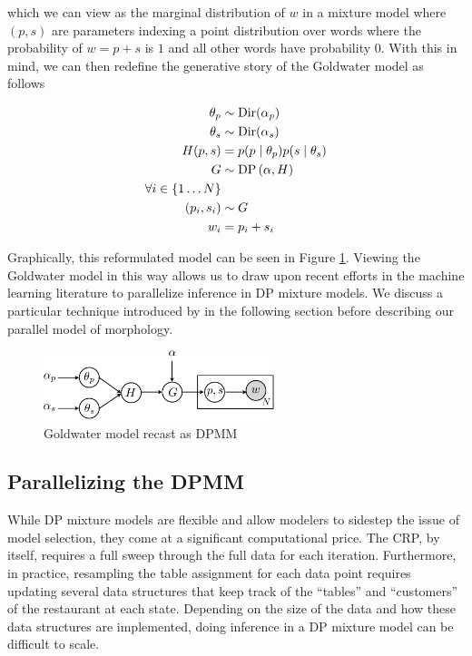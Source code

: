 which we can view as the marginal distribution of $w$ in a mixture
model where $(p,s)$ are parameters indexing a point distribution over
words where the probability of $w = p + s$ is $1$ and all other words
have probability $0$. With this in mind, we can then redefine the
generative story of the Goldwater model as follows

\begin{align*}
  \theta_p & \sim \mathrm{Dir}(\alpha_p) \\
  \theta_s & \sim \mathrm{Dir}(\alpha_s) \\
  H(p, s) & = p(p \mid \theta_p) p(s \mid \theta_s) \\
  G & \sim \mathrm{DP}\left(\alpha, H\right)\\
  \forall i \in \{1 \dots N\} \\
  (p_i, s_i) & \sim G \\
  w_i & = p_i+s_i
\end{align*}

Graphically, this reformulated model can be seen in Figure
\ref{fig:v2}. Viewing the Goldwater model in this way allows us to
draw upon recent efforts in the machine learning literature to
parallelize inference in DP mixture models. We discuss a particular
technique introduced by \cite{williamson2013} in the following section
before describing our parallel model of morphology.

\begin{figure}[h]
\centering
\includegraphics[width=0.6\textwidth]{fig/v2}
\caption{Goldwater model recast as DPMM}
\label{fig:v2}
\end{figure}

\subsection{Parallelizing the DPMM}

While DP mixture models are flexible and allow modelers to sidestep
the issue of model selection, they come at a significant computational
price. The CRP, by itself, requires a full sweep through the full data
for each iteration. Furthermore, in practice, resampling the table
assignment for each data point requires updating several data
structures that keep track of the ``tables'' and ``customers'' of the
restaurant at each state. Depending on the size of the data and how
these data structures are implemented, doing inference in a DP mixture
model can be difficult to scale.

